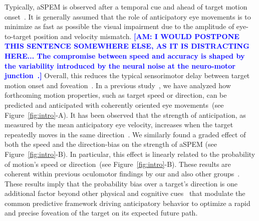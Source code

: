\documentclass[12pt,english]{article}%
\newcommand{\citep}[1]{\parencite{#1}}
\newcommand{\seeFig}[1]{Figure~\ref{fig:#1}}
\newcommand{\AM}[1]{\textbf{\textcolor{blue}{[AM: #1]}}}
\begin{document}
Typically, aSPEM is observed after a temporal cue and
ahead of target motion onset~\citep{Kowler1979a,Kowler1979b, Kowler1984}. %
It is generally assumed that the role of anticipatory eye movements is
to minimize as fast as possible the visual impairment due
to the amplitude of eye-to-target position and velocity mismatch.
\AM{I WOULD POSTPONE THIS SENTENCE SOMEWHERE ELSE, AS IT IS DISTRACTING HERE... The compromise between speed and accuracy is shaped
by the variability introduced by the neural noise
at the neuro-motor junction~\citep{Harris98}.}
Overall, this reduces the typical sensorimotor delay
between target motion onset and foveation~\citep{REFNEEDED}.
In a previous study~\citep{Montagnini2010},
we have analyzed how forthcoming motion properties,
such as target speed or direction, can be
predicted and anticipated with coherently oriented eye movements~(see \seeFig{intro}-A).
It has been observed that the strength of anticipation,
as measured by the mean anticipatory eye velocity,
increases when the target repeatedly moves in the same direction~\citep{Kowler1984, Kowler1989, Heinen2005}.
We similarly found a graded effect of both the speed and the direction-bias
on the strength of aSPEM (see \seeFig{intro}-B).
In particular, this effect is linearly related
to the probability of motion's speed or direction~(see \seeFig{intro}-B).
These results are coherent within previous oculomotor findings
by our and also other groups~\citep{SantosKowler2017}.
These results imply that the probability bias over a target's direction is
one additional factor beyond other physical and cognitive cues~\citep{Kowler2014, SantosKowler2017,Damasse18}
that modulate the common predictive framework
driving anticipatory behavior to optimize a rapid and
precise foveation of the target on its expected future path.
\end{document}
